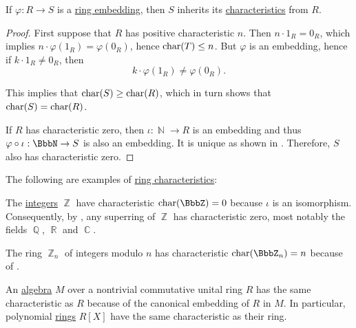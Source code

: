 \begin{proposition}\label{thm:ring_embedding_preserves_characterstic}
  If \( \varphi: R \to S \) is a \hyperref[def:ring/homomorphism]{ring embedding}, then \( S \) inherits its \hyperref[def:semiring_characteristic]{characteristics} from \( R \).
\end{proposition}
\begin{proof}
  First suppose that \( R \) has positive characteristic \( n \). Then \( n \cdot 1_R = 0_R \), which implies \( n \cdot \varphi(1_R) = \varphi(0_R) \), hence \( \operatorname{char}(T) \leq n \). But \( \varphi \) is an embedding, hence if \( k \cdot 1_R \neq 0_R \), then
  \begin{equation*}
    k \cdot \varphi(1_R) \neq \varphi(0_R).
  \end{equation*}

  This implies that \( \operatorname{char}(S) \geq \operatorname{char}(R) \), which in turn shows that \( \operatorname{char}(S) = \operatorname{char}(R) \).

  If \( R \) has characteristic zero, then \( \iota: \BbbN \to R \) is an embedding and thus \( \varphi \bincirc \iota: \BbbN \to S \) is also an embedding. It is unique as shown in . Therefore, \( S \) also has characteristic zero.
\end{proof}

\begin{example}\label{ex:def:ring_characteristic}
  The following are examples of \hyperref[def:ring_characteristic]{ring characteristics}:
  \begin{thmenum}
     The \hyperref[def:set_of_integers]{integers} \( \BbbZ \) have characteristic \( \op{char}(\BbbZ) = 0 \) because \( \iota \) is an isomorphism. Consequently, by , any superring of \( \BbbZ \) has characteristic zero, most notably the fields \( \BbbQ \), \( \BbbR \) and \( \BbbC \).

     The ring \hyperref[thm:ring_of_integers_modulo]{\( \BbbZ_n \)} of integers modulo \( n \) has characteristic \( \op{char}(\BbbZ_n) = n \) because of .

     An \hyperref[def:algebra_over_semiring]{algebra} \( M \) over a nontrivial commutative unital ring \( R \) has the same characteristic as \( R \) because of the canonical embedding of \( R \) in \( M \). In particular, polynomial \hyperref[def:algebra_of_polynomials]{rings} \( R[X] \) have the same characteristic as their ring.
  \end{thmenum}
\end{example}

